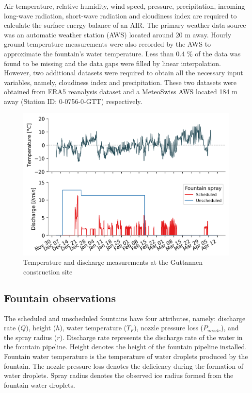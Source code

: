 \documentclass[tc, manuscript]{copernicus}
\begin{document}
Air temperature, relative humidity, wind speed, pressure, precipitation, incoming long-wave radiation, short-wave radiation
and cloudiness index are required to calculate the surface energy balance of an AIR. The primary weather data
source was an automatic weather station (AWS) located around 20 m away. Hourly ground temperature measurements
were also recorded by the AWS to approximate the fountain's water temperature. Less than 0.4 \% of the data was
found to be missing and the data gaps were filled by linear interpolation. However, two additional datasets were
required to obtain all the necessary input variables, namely, cloudiness index and precipitation. These two
datasets were obtained from ERA5 reanalysis dataset \citep{hersbachERA5GlobalReanalysis2020} and a MeteoSwiss AWS
located 184 m away (Station ID: 0-0756-0-GTT) respectively.

\begin{figure}[t]
\includegraphics[width=12cm]{Figures/disvstemp.png}
\caption{Temperature and discharge measurements at the Guttannen construction site}
\label{fig:aws} 
\end{figure}

\subsection{Fountain observations}

The scheduled and unscheduled fountains have four attributes, namely: discharge rate ($Q$), height ($h$), water
temperature ($T_F$), nozzle pressure loss ($P_{nozzle}$), and the spray radius ($r$). Discharge rate represents
the discharge rate of the water in the fountain pipeline. Height denotes the height of the fountain pipeline
installed. Fountain water temperature is the temperature of water droplets produced by the fountain.
The nozzle pressure loss denotes the deficiency during the formation of water droplets. Spray radius denotes the
observed ice radius formed from the fountain water droplets.
\end{document}
